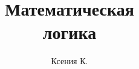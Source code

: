 \documentclass[titlepage, nofonts, nobib]{tufte-handout}
\author{Ксения К.}
\title{Математическая\\ логика}
\begin{document}
\maketitle

\setcounter{tocdepth}{1}
\tableofcontents

\pagebreak


\pagebreak


\pagebreak


\pagebreak


\pagebreak


\begin{fullwidth}
  \newcommand\letterheading[1]{
    \par\textbf{#1}\par\nopagebreak
  }
  \printindex
\end{fullwidth}
\end{document}
